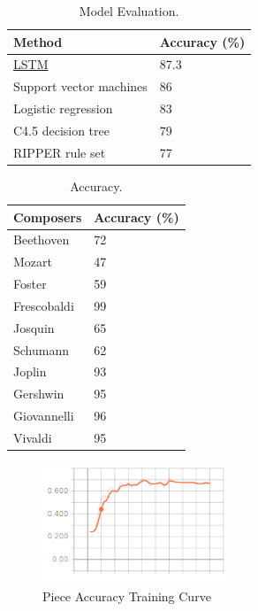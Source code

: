 \documentclass[11pt,a4paper]{article}
\begin{document}
\begin{table}[t!]
\begin{center}
\begin{tabular}{|l|l|}
\hline \bf Method & \bf Accuracy (\%) \\ \hline
\underline{LSTM} & 87.3 \\
Support vector machines & 86 \\
Logistic regression & 83\\
C4.5 decision tree & 79\\
RIPPER rule set & 77\\
\hline
\end{tabular}
\end{center}
\caption{\label{resutls-table} Model Evaluation. }
\end{table}


\begin{table}[t!]
\begin{center}
\begin{tabular}{|l|l|}
\hline \bf Composers & \bf Accuracy (\%)\\ \hline
Beethoven & 72 \\
Mozart & 47\\
Foster & 59\\
Frescobaldi & 99\\
Josquin & 65\\
Schumann & 62\\
Joplin & 93\\
Gershwin & 95\\
Giovannelli & 96\\
Vivaldi & 95  \\
\hline
\end{tabular}
\end{center}
\caption{\label{test-accuracy-table}Accuracy. }
\end{table}


\begin{figure}[h]
\caption{Piece Accuracy Training Curve}
\centering
\includegraphics[width=0.5\textwidth]{Gaccuracy.png}
\end{figure}
\end{document}

